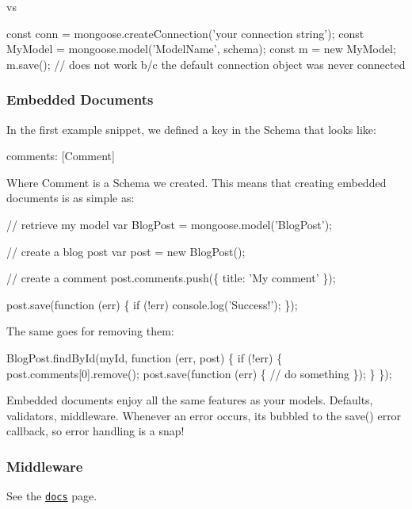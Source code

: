 vs


\begin{DoxyCode}
const conn = mongoose.createConnection('your connection string');
const MyModel = mongoose.model('ModelName', schema);
const m = new MyModel;
m.save(); // does not work b/c the default connection object was never connected
\end{DoxyCode}


\subsubsection*{Embedded Documents}

In the first example snippet, we defined a key in the Schema that looks like\+:


\begin{DoxyCode}
comments: [Comment]
\end{DoxyCode}


Where {\ttfamily Comment} is a {\ttfamily Schema} we created. This means that creating embedded documents is as simple as\+:


\begin{DoxyCode}
// retrieve my model
var BlogPost = mongoose.model('BlogPost');

// create a blog post
var post = new BlogPost();

// create a comment
post.comments.push(\{ title: 'My comment' \});

post.save(function (err) \{
  if (!err) console.log('Success!');
\});
\end{DoxyCode}


The same goes for removing them\+:


\begin{DoxyCode}
BlogPost.findById(myId, function (err, post) \{
  if (!err) \{
    post.comments[0].remove();
    post.save(function (err) \{
      // do something
    \});
  \}
\});
\end{DoxyCode}


Embedded documents enjoy all the same features as your models. Defaults, validators, middleware. Whenever an error occurs, it\textquotesingle{}s bubbled to the {\ttfamily save()} error callback, so error handling is a snap!

\subsubsection*{Middleware}

See the \href{http://mongoosejs.com/docs/middleware.html}{\tt docs} page.

